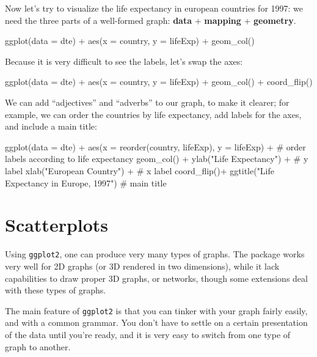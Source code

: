 \documentclass[
  letterpaper,
  DIV=11,
  numbers=noendperiod]{scrreprt}
\newenvironment{Shaded}{\begin{snugshade}}{\end{snugshade}}
\newcommand{\NormalTok}[1]{\textcolor[rgb]{0.00,0.23,0.31}{#1}}
\begin{document}
Now let's try to visualize the life expectancy in european countries for
1997: we need the three parts of a well-formed graph: \textbf{data} +
\textbf{mapping} + \textbf{geometry}.

\begin{Shaded}
\begin{Highlighting}[]
\NormalTok{ggplot(data = dte) + }
\NormalTok{    aes(x = country, y = lifeExp) + }
\NormalTok{    geom\_col()}
\end{Highlighting}
\end{Shaded}

Because it is very difficult to see the labels, let's swap the axes:

\begin{Shaded}
\begin{Highlighting}[]
\NormalTok{ggplot(data = dte) + }
\NormalTok{    aes(x = country, y = lifeExp) + }
\NormalTok{    geom\_col() + }
\NormalTok{    coord\_flip()}
\end{Highlighting}
\end{Shaded}

We can add ``adjectives'' and ``adverbs'' to our graph, to make it
clearer; for example, we can order the countries by life expectancy, add
labels for the axes, and include a main title:

\begin{Shaded}
\begin{Highlighting}[]
\NormalTok{ggplot(data = dte) + }
\NormalTok{  aes(x = reorder(country, lifeExp), y = lifeExp) + \# order labels according to life expectancy}
\NormalTok{  geom\_col() +}
\NormalTok{  ylab("Life Expectancy") + \# y label}
\NormalTok{  xlab("European Country") + \# x label}
\NormalTok{  coord\_flip()+}
\NormalTok{  ggtitle("Life Expectancy in Europe, 1997") \# main title}
\end{Highlighting}
\end{Shaded}

\section{Scatterplots}\label{scatterplots}

Using \texttt{ggplot2}, one can produce very many types of graphs. The
package works very well for 2D graphs (or 3D rendered in two
dimensions), while it lack capabilities to draw proper 3D graphs, or
networks, though some extensions deal with these types of graphs.

The main feature of \texttt{ggplot2} is that you can tinker with your
graph fairly easily, and with a common grammar. You don't have to settle
on a certain presentation of the data until you're ready, and it is very
easy to switch from one type of graph to another.
\end{document}
